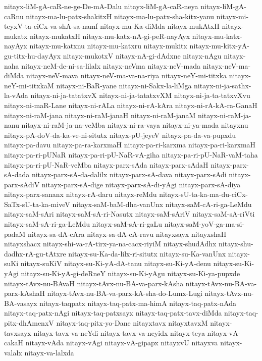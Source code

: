 {nitayx-liM-gA-caR-ne-ge-De-mA-Dalu
nitayx-liM-gA-caR-neya
nitayx-liM-gA-caRnu
nitayx-ma-lu-patx-shakitxH
nitayx-ma-lu-patx-sha-kitx-yanu
nitayx-mi-teyxV-ta-ciCx-va-shA-sa-namf
nitayx-mu-Ka-diMda
nitayx-mukAtxH
nitayx-mukatx
nitayx-mukatxH
nitayx-mu-katx-nA-gi-peR-nayAyx
nitayx-mu-katx-nayAyx
nitayx-mu-katxnu
nitayx-mu-katxru
nitayx-mukitx
nitayx-mu-kitx-yA-gu-titx-hu-dayAyx
nitayx-mukotxV
nitayx-nA-gi-dAdxne
nitayx-nAgu
nitayx-naha
nitayx-neM-de-ni-sa-lilalx
nitayx-neVma
nitayx-neV-mada
nitayx-neV-ma-diMda
nitayx-neV-mava
nitayx-neV-ma-va-na-riya
nitayx-neY-mi-titxka
nitayx-neY-mi-titxkaM
nitayx-ni-BaR-yane
nitayx-ni-Sakx-la-liMga
nitayx-ni-ja-sathx-la-vAda
nitayx-ni-ja-tatatxvX
nitayx-ni-ja-tatatxvXM
nitayx-ni-ja-ta-tatxvXvu
nitayx-ni-maR-Lane
nitayx-ni-rALa
nitayx-ni-rA-kAra
nitayx-ni-rA-kA-ra-GanaH
nitayx-ni-raM-jana
nitayx-ni-raM-janaH
nitayx-ni-raM-janaM
nitayx-ni-raM-ja-nanu
nitayx-ni-raM-ja-na-veMba
nitayx-ni-ra-vaya
nitayx-ni-ya-mada
nitayxnu
nitayx-pA-doV-da-ka-ve-ni-situtx
nitayx-pU-jeyeV
nitayx-pa-da-va-pupxdu
nitayx-pa-davu
nitayx-pa-ra-karxmaH
nitayx-pa-ri-karxma
nitayx-pa-ri-karxmaH
nitayx-pa-ri-pUNaR
nitayx-pa-ri-pU-NaR-vA-giha
nitayx-pa-ri-pU-NaR-vaM-taha
nitayx-pa-ri-pU-NaR-veMba
nitayx-parx-sAda
nitayx-parx-sAdaH
nitayx-parx-sA-dada
nitayx-parx-sA-da-dalilx
nitayx-parx-sA-dava
nitayx-parx-sAdi
nitayx-parx-sAdiV
nitayx-parx-sA-dige
nitayx-parx-sA-di-yAgi
nitayx-parx-sA-diya
nitayx-parx-sananx
nitayx-rA-daru
nitayx-reMdu
nitayx-sU-ta-ka-ma-du-ciCx-SaTx-sU-ta-ka-miveV
nitayx-saM-baM-dha-vanUnx
nitayx-saM-cA-ri-ga-LeMdu
nitayx-saM-sAri
nitayx-saM-sA-ri-Nasutx
nitayx-saM-sAriV
nitayx-saM-sA-riVti
nitayx-saM-sA-ri-ga-LeMdu
nitayx-saM-sA-ri-gaLu
nitayx-saM-yoV-ga-ma-si-padaM
nitayx-sa-dA-cAra
nitayx-sa-dA-cA-ravu
nitayxsayx
nitayxshaH
nitayxshacx
nitayx-shi-va-rA-tirx-ya-na-cacx-riyiM
nitayx-shudAdhx
nitayx-shu-dadhx-rA-gu-tAtxre
nitayx-su-Ka-da-lilx-ri-situtx
nitayx-su-Ka-vanUnx
nitayx-suKi
nitayx-suKiV
nitayx-su-Ki-yA-dA-tanu
nitayx-su-Ki-yA-denu
nitayx-su-Ki-yAgi
nitayx-su-Ki-yA-gi-deRneY
nitayx-su-Ki-yAgu
nitayx-su-Ki-ya-pupxde
nitayx-tAvx-nu-BAvaH
nitayx-tAvx-nu-BA-va-parx-kAsha
nitayx-tAvx-nu-BA-va-parx-kAshaH
nitayx-tAvx-nu-BA-va-parx-kA-sha-do-Lumx-Lugi
nitayx-tAvx-nu-BA-vasayx
nitayx-taqpatx
nitayx-taq-patx-ma-himA
nitayx-taq-patx-nAda
nitayx-taq-patx-nAgi
nitayx-taq-patxsayx
nitayx-taq-patx-tavx-diMda
nitayx-taq-pitx-dhAmenxV
nitayx-taq-pitx-yo-Dane
nitayxtavx
nitayxtavxM
nitayx-tavxsayx
nitayx-tavx-va-neYdi
nitayx-tavx-va-neyidx
nitayx-teya
nitayx-vA-cakaH
nitayx-vAda
nitayx-vAgi
nitayx-vA-gipapx
nitayxvU
nitayxva
nitayx-valalx
nitayx-va-lalxda
}
